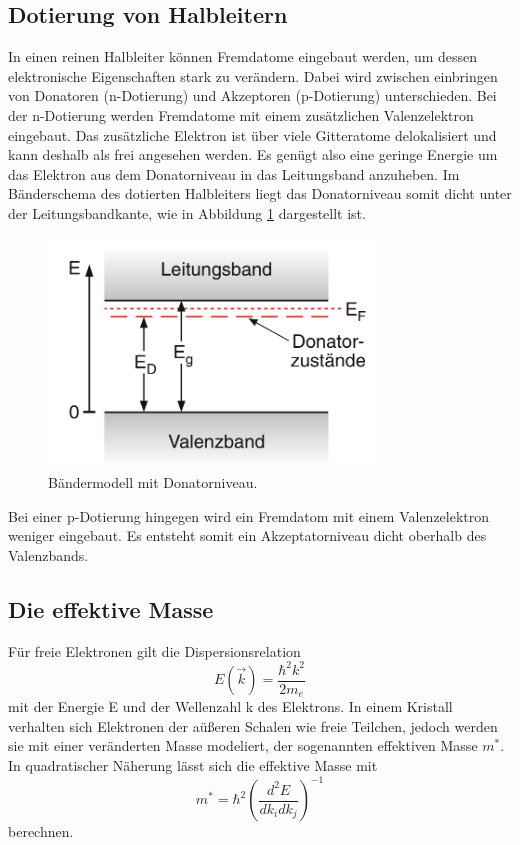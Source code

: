 \subsection{Dotierung von Halbleitern}
In einen reinen Halbleiter können Fremdatome eingebaut werden, um dessen elektronische Eigenschaften stark zu verändern.
Dabei wird zwischen einbringen von Donatoren (n-Dotierung) und Akzeptoren (p-Dotierung) unterschieden.
Bei der n-Dotierung werden Fremdatome mit einem zusätzlichen Valenzelektron eingebaut. Das zusätzliche Elektron ist über viele Gitteratome delokalisiert
und kann deshalb als frei angesehen werden. Es genügt also eine geringe Energie um das Elektron aus dem Donatorniveau in das Leitungsband anzuheben. 
Im Bänderschema des dotierten Halbleiters liegt das Donatorniveau somit dicht unter der Leitungsbandkante, wie in Abbildung \ref{pic:ndotierung} dargestellt ist.
\begin{figure}
    \centering
    \includegraphics[width = 0.78\textwidth]{pics/n_dotierung.png}
    \caption{Bändermodell mit Donatorniveau.\cite{Demtröder3}}
    \label{pic:ndotierung}
\end{figure}
Bei einer p-Dotierung hingegen wird ein Fremdatom mit einem Valenzelektron weniger eingebaut. Es entsteht somit ein Akzeptatorniveau dicht oberhalb
des Valenzbands.

\subsection{Die effektive Masse}
Für freie Elektronen gilt die Dispersionsrelation
\begin{equation}
    E(\vec{k}) = \frac{\hbar^2 k^2}{2 m_e}
    \label{eqn:frei}
\end{equation}
mit der Energie E und der Wellenzahl k des Elektrons. In einem Kristall verhalten sich Elektronen der aüßeren Schalen wie freie Teilchen, jedoch werden sie mit einer veränderten Masse modeliert,
der sogenannten effektiven Masse $m^*$. In quadratischer Näherung lässt sich die effektive Masse mit
\begin{equation}
    m^* = \hbar^2 \left(\frac{d^2 E}{d k_i d k_j}\right)^{-1}
\end{equation}
berechnen. 
 
